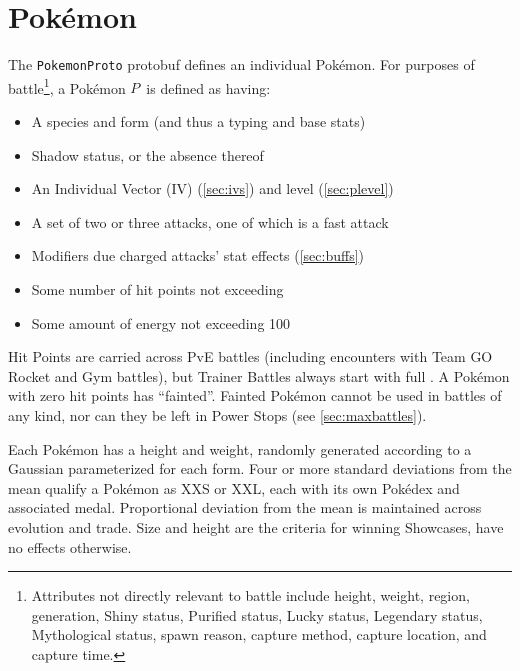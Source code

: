 \chapter{Pokémon\label{chap:pokemon}}
The \texttt{PokemonProto} protobuf defines an individual Pokémon.
For purposes of battle\footnote{Attributes not directly relevant to battle include height, weight, region,
generation, Shiny status, Purified status, Lucky status, Legendary status, Mythological status, spawn
reason, capture method, capture location, and capture time.}, a Pokémon $P$\, is defined as having:
\begin{itemize}
\item A species and form (and thus a typing and base stats)
\item Shadow status, or the absence thereof
\item An Individual Vector (IV) (\autoref{sec:ivs}) and level (\autoref{sec:plevel})
\item A set of two or three attacks, one of which is a fast attack
\item Modifiers due charged attacks' stat effects (\autoref{sec:buffs})
\item Some number of hit points not exceeding \MHP
\item Some amount of energy not exceeding 100
\end{itemize}
Hit Points are carried across PvE battles (including encounters with
  Team GO Rocket and Gym battles), but Trainer Battles always start with full \HP\@.
A Pokémon with zero hit points has ``fainted''.
Fainted Pokémon cannot be used in battles of any kind, nor can they be left in
 Power Stops (see \autoref{sec:maxbattles}).

Each Pokémon has a height and weight, randomly generated according to a Gaussian
 parameterized for each form.
Four or more standard deviations from the mean qualify a Pokémon as XXS or XXL,
 each with its own Pokédex and associated medal.
Proportional deviation from the mean is maintained across evolution and trade.
Size and height are the criteria for winning Showcases, have no effects otherwise.

